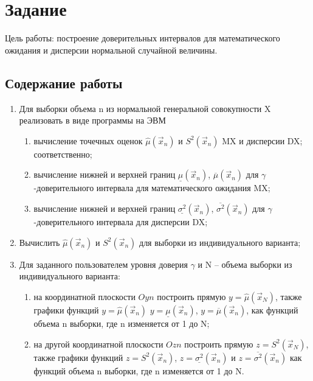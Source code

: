 \chapter{Задание}
Цель работы: построение доверительных интервалов для математического ожидания и дисперсии нормальной случайной величины.
\section{Содержание работы}
\begin{enumerate}
	\item Для выборки объема n из нормальной генеральной совокупности X реализовать в виде программы на ЭВМ
	\begin{enumerate}
		\item вычисление точечных оценок $\hat{\mu}(\vec{x}_n)$ и $S^2(\vec{x}_n)$
		MX и дисперсии DX; соответственно;
		\item вычисление нижней и верхней границ $\underline{{\mu}}(\vec{x}_n)$, $\overline{{\mu}}(\vec{x}_n)$ для \newline $\gamma$-доверительного интервала для
		математического ожидания MX;
		\item вычисление нижней и верхней границ 
		$\underline{\sigma^2}(\vec{x}_n)$, 
		$\overline{\sigma^2}(\vec{x}_n)$ для \newline $\gamma$-доверительного интервала для
		дисперсии DX;
	\end{enumerate}
	\item Вычислить $\hat{\mu}(\vec{x}_n)$ и $S^2(\vec{x}_n)$ для выборки из индивидуального варианта;
	\item Для заданного пользователем уровня доверия $\gamma$ и N – объема выборки из индивидуального варианта:
	\begin{enumerate}
		\item на координатной плоскости $Oyn$ построить прямую $y=\hat{\mu}(\vec{x}_N)$, также графики функций $y=\hat{\mu}(\vec{x}_n)$
		$y=\underline{{\mu}}(\vec{x}_n)$, $y=\overline{{\mu}}(\vec{x}_n)$,  как функций объема n выборки, где n изменяется от 1 до N;
		\item на другой координатной плоскости $Ozn$ построить прямую $z = S^2(\vec{x}_N)$, также графики
		функций $z = S^2(\vec{x}_n)$, $z = \underline{\sigma^2}(\vec{x}_n)$
		и $z = \overline{\sigma^2}(\vec{x}_n)$ как функций объема n выборки, где n
		изменяется от 1 до N.
	\end{enumerate}
\end{enumerate}

